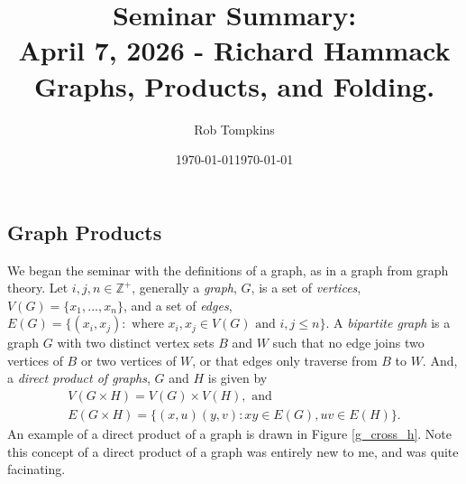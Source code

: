 \documentclass[12pt]{amsart}
\title{Seminar Summary:\\April 7, 2026 - Richard Hammack\\Graphs, Products, and Folding.}
\author{Rob Tompkins}
\date{\today}
\theoremstyle{conjecture}
\theoremstyle{definition}
\theoremstyle{question}
\theoremstyle{theorem}
\begin{document}
    \maketitle
    \date{\today}
    \begin{onehalfspace}
        \section{Graph Products}
        We began the seminar with the definitions of a graph, as in a graph from graph theory.
        Let $i,j,n\in\mathbb{Z}^+$, generally a \emph{graph}, $G$, is a set of \emph{vertices},
        $V(G) = \{x_1, \ldots,x_n\}$, and a set of \emph{edges}, $E(G) = \{(x_i,x_j):
        \text{ where } x_i,x_j\in V(G) \text{ and } i,j \le n\}$.
        A \emph{bipartite graph} is a graph $G$ with two distinct vertex sets $B$ and $W$ such that no
        edge joins two vertices of $B$ or two vertices of $W$, or that edges only traverse from $B$ to $W$.
        And, a \emph{direct product of graphs}, $G$ and $H$ is given by
        \begin{gather*}
            V(G\times H) = V(G) \times V(H), \text{ and}\\
            E(G\times H) = \{(x,u)(y,v): xy\in E(G), uv\in E(H)\}.
        \end{gather*}
        An example of a direct product of a graph is drawn in Figure \ref{g_cross_h}.
        Note this concept of a direct product of a graph was entirely new to me, and was
        quite facinating.
        \begin{figure}
\end{figure}
\end{onehalfspace}
\end{document}
